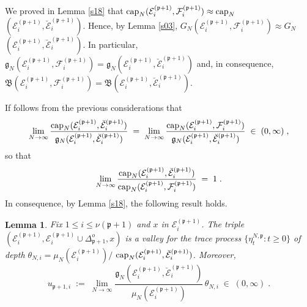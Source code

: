 \documentclass[reqno]{amsart}
\newtheorem{lemma}[theorem]{Lemma}
\begin{document}
We proved in Lemma \ref{s18} that ${{\rm cap}}_N ({{\mathcal E}}^{({{\mathfrak p}} +1)}_i , {{\mathcal F}}^{({{\mathfrak p}} +1)}_i) \approx {{\rm cap}}_N$ $({{\mathcal E}}^{({{\mathfrak p}} +1)}_i , \breve{{{\mathcal E}}}^{({{\mathfrak p}} +1)}_i)$. Hence, by Lemma \ref{s03}, $G_N ({{\mathcal E}}^{({{\mathfrak p}}
  +1)}_i , {{\mathcal F}}^{({{\mathfrak p}} +1)}_i) \approx G_N$ $({{\mathcal E}}^{({{\mathfrak p}} +1)}_i ,
\breve{{{\mathcal E}}}^{({{\mathfrak p}} +1)}_i)$. In particular, ${{\mathfrak g}}_N ({{\mathcal E}}^{({{\mathfrak p}}
  +1)}_i , {{\mathcal F}}^{({{\mathfrak p}} +1)}_i) ={{\mathfrak g}}_N ({{\mathcal E}}^{({{\mathfrak p}} +1)}_i ,
\breve{{{\mathcal E}}}^{({{\mathfrak p}} +1)}_i)$ and, in consequence, ${{\mathfrak B}}({{\mathcal E}}^{({{\mathfrak p}} +1)}_i , {{\mathcal F}}^{({{\mathfrak p}} +1)}_i) = {{\mathfrak B}}({{\mathcal E}}^{({{\mathfrak p}} +1)}_i ,
\breve{{{\mathcal E}}}^{({{\mathfrak p}} +1)}_i)$. 

If follows from the previous considerations that
\begin{equation*}
\lim_{N\to\infty} \frac{{{\rm cap}}_N({{\mathcal E}}^{({{\mathfrak p}} +1)}_i ,
\breve{{{\mathcal E}}}^{({{\mathfrak p}} +1)}_i)}{{{\mathfrak g}}_N ({{\mathcal E}}^{({{\mathfrak p}} +1)}_i ,
\breve{{{\mathcal E}}}^{({{\mathfrak p}} +1)}_i)} \;=\;
\lim_{N\to\infty} \frac{{{\rm cap}}_N({{\mathcal E}}^{({{\mathfrak p}} +1)}_i ,
{{\mathcal F}}^{({{\mathfrak p}} +1)}_i)}{{{\mathfrak g}}_N ({{\mathcal E}}^{({{\mathfrak p}} +1)}_i ,
\breve{{{\mathcal E}}}^{({{\mathfrak p}} +1)}_i)} \;\in\; (0,\infty)\;,
\end{equation*}
so that
\begin{equation*}
\lim_{N\to\infty} \frac{{{\rm cap}}_N({{\mathcal E}}^{({{\mathfrak p}} +1)}_i ,
\breve{{{\mathcal E}}}^{({{\mathfrak p}} +1)}_i)}{{{\rm cap}}_N({{\mathcal E}}^{({{\mathfrak p}} +1)}_i ,
{{\mathcal F}}^{({{\mathfrak p}} +1)}_i)} \;=\; 1\;.
\end{equation*}
In consequence, by Lemma \ref{s18}, the following result holds.

\begin{lemma}
\label{s34}
Fix $1\le i\le \nu ({{\mathfrak p}}+1)$ and $x$ in ${{\mathcal E}}^{({{\mathfrak p}} +1)}_i$.  The
triple $({{\mathcal E}}^{({{\mathfrak p}} +1)}_i, {{\mathcal E}}^{({{\mathfrak p}} +1)}_i \cup \Delta^o_{{{\mathfrak p}}+1} ,x)$ is a valley for the trace process $\{\eta^{N,{{\mathfrak p}}}_t :
t\ge 0\}$ of depth $\theta_{N,i} = \mu_N({{\mathcal E}}^{({{\mathfrak p}} +1)}_i)/$
${{\rm cap}}_N ({{\mathcal E}}^{({{\mathfrak p}} +1)}_i , \breve{{{\mathcal E}}}^{({{\mathfrak p}}
  +1)}_i)$. Moreover,
\begin{equation*}
u_{{{\mathfrak p}}+1, i} \;:=\; \lim_{N\to\infty} \frac{{{\mathfrak g}}_N ({{\mathcal E}}^{({{\mathfrak p}} +1)}_i ,
\breve{{{\mathcal E}}}^{({{\mathfrak p}} +1)}_i)}{\mu_N({{\mathcal E}}^{({{\mathfrak p}} +1)}_i)}\,
\theta_{N,i} \;\in\; (0,\infty)\;.
\end{equation*}
\end{lemma}
\end{document}
